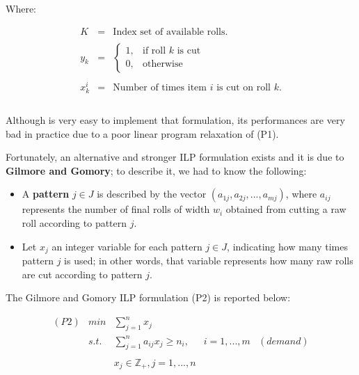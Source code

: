 \documentclass[10pt,a4paper]{article}
\begin{document}
Where:

\begin{equation}
\begin{array} {lllrr} 

K & = & \text{Index set of available rolls.} \\\\
y_k & = & \begin{cases} 1, & \mbox{if roll } k\mbox{ is cut} \\ 0, & \mbox{otherwise} \end{cases} \\\\
x_k^i & = & \text{Number of times item } i \text{ is cut on roll } k. \\\\
\end{array}
\end{equation}

Although is very easy to implement that formulation, its performances are very bad in practice due to a poor linear program relaxation of (P1).

Fortunately, an alternative and stronger ILP formulation exists and it is due to \textbf{Gilmore and Gomory}; to describe it, we had to know the following:

\begin{itemize}
\item A \textbf{pattern} $j \in J$ is described by the vector $(a_{1j},a_{2j},...,a_{mj})$, where $a_{ij}$ represents the number of final rolls of width $w_i$ obtained from cutting a raw roll according to pattern $j$. 

\item Let $x_j$ an integer variable for each pattern $j \in J$, indicating how many times pattern $j$ is used; in other words, that variable represents how many raw rolls are cut according to pattern $j$. 
\end{itemize}

The Gilmore and Gomory ILP formulation (P2) is reported below:

\begin{equation}\label{eqn:P2}
\begin{array} {lllrr} 

(P2) & min & \displaystyle\sum_{j = 1}^{n} x_j && \\
& s.t. & \displaystyle\sum_{j = 1}^{n} a_{ij} x_j \geq n_i, & i = 1,...,m & (demand) \\\\

& & x_j \in \mathbb{Z}_{+}, j = 1,...,n  && \\\\
\end{array}
\end{equation}
\end{document}
